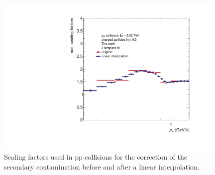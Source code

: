 \documentclass[12pt,a4paper]{report}
\begin{document}
\begin{figure}[tb!]
\centering
\includegraphics[width=11cm]{Plots/secscalingfactors.pdf}  
\caption{Scaling factors used in pp collisions for the correction of the secondary contamination before and after a linear interpolation.}
\label{scalefactors} 
\end{figure}
\end{document}
